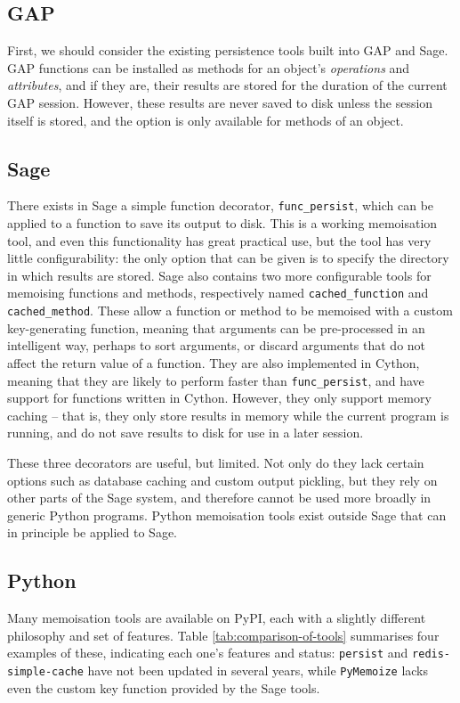 \documentclass{deliverablereport}
\begin{document}
\subsection{GAP}
First, we should consider the existing persistence tools built into GAP and
Sage.  GAP functions can be installed as methods for an object's
\emph{operations} and \emph{attributes}, and if they are, their results are
stored for the duration of the current GAP session.  However, these results are
never saved to disk unless the session itself is stored, and the option is only
available for methods of an object.

\subsection{Sage}
There exists in Sage a simple function decorator, \texttt{func\_persist}, which
can be applied to a function to save its output to disk.  This is a working
memoisation tool, and even this functionality has great practical use, but the
tool has very little configurability: the only option that can be given is to
specify the directory in which results are stored.  Sage also contains two more
configurable tools for memoising functions and methods, respectively named
\texttt{cached\_function} and \texttt{cached\_method}.  These allow a function
or method to be memoised with a custom key-generating function, meaning that
arguments can be pre-processed in an intelligent way, perhaps to sort arguments,
or discard arguments that do not affect the return value of a function.
They are also implemented in Cython, meaning that they are likely to perform
faster than \texttt{func\_persist}, and have support for functions written in
Cython.
However, they only support memory caching -- that is, they only store results in
memory while the current program is running, and do not save results to disk for
use in a later session.

These three decorators are useful, but limited.  Not only do they lack certain
options such as database caching and custom output pickling, but they rely on
other parts of the Sage system, and therefore cannot be used more broadly in
generic Python programs.  Python memoisation tools exist outside Sage that can
in principle be applied to Sage.

\subsection{Python}
Many memoisation tools are available on PyPI, each with a slightly different
philosophy and set of features.  Table \ref{tab:comparison-of-tools} summarises
four examples of these, indicating each one's features and status:
\texttt{persist} and \texttt{redis-simple-cache} have not been updated in
several years, while \texttt{PyMemoize} lacks even the custom key function
provided by the Sage tools.
\end{document}
